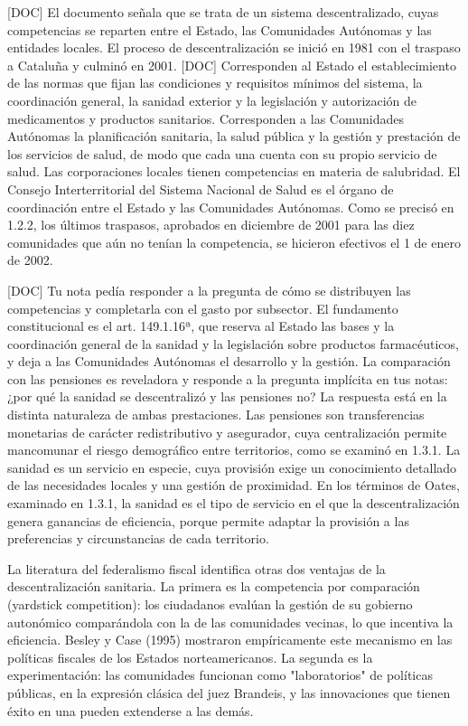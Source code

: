 \documentclass[10pt,a4paper]{article}
\begin{document}
[DOC] El documento señala que se trata de un sistema descentralizado, cuyas competencias se reparten entre el Estado, las Comunidades Autónomas y las entidades locales. El proceso de descentralización se inició en 1981 con el traspaso a Cataluña y culminó en 2001. [DOC] Corresponden al Estado el establecimiento de las normas que fijan las condiciones y requisitos mínimos del sistema, la coordinación general, la sanidad exterior y la legislación y autorización de medicamentos y productos sanitarios. Corresponden a las Comunidades Autónomas la planificación sanitaria, la salud pública y la gestión y prestación de los servicios de salud, de modo que cada una cuenta con su propio servicio de salud. Las corporaciones locales tienen competencias en materia de salubridad. El Consejo Interterritorial del Sistema Nacional de Salud es el órgano de coordinación entre el Estado y las Comunidades Autónomas. Como se precisó en 1.2.2, los últimos traspasos, aprobados en diciembre de 2001 para las diez comunidades que aún no tenían la competencia, se hicieron efectivos el 1 de enero de 2002.

[DOC] Tu nota pedía responder a la pregunta de cómo se distribuyen las competencias y completarla con el gasto por subsector. El fundamento constitucional es el art. 149.1.16ª, que reserva al Estado las bases y la coordinación general de la sanidad y la legislación sobre productos farmacéuticos, y deja a las Comunidades Autónomas el desarrollo y la gestión. La comparación con las pensiones es reveladora y responde a la pregunta implícita en tus notas: ¿por qué la sanidad se descentralizó y las pensiones no? La respuesta está en la distinta naturaleza de ambas prestaciones. Las pensiones son transferencias monetarias de carácter redistributivo y asegurador, cuya centralización permite mancomunar el riesgo demográfico entre territorios, como se examinó en 1.3.1. La sanidad es un servicio en especie, cuya provisión exige un conocimiento detallado de las necesidades locales y una gestión de proximidad. En los términos de Oates, examinado en 1.3.1, la sanidad es el tipo de servicio en el que la descentralización genera ganancias de eficiencia, porque permite adaptar la provisión a las preferencias y circunstancias de cada territorio.

La literatura del federalismo fiscal identifica otras dos ventajas de la descentralización sanitaria. La primera es la competencia por comparación (yardstick competition): los ciudadanos evalúan la gestión de su gobierno autonómico comparándola con la de las comunidades vecinas, lo que incentiva la eficiencia. Besley y Case (1995) mostraron empíricamente este mecanismo en las políticas fiscales de los Estados norteamericanos. La segunda es la experimentación: las comunidades funcionan como "laboratorios" de políticas públicas, en la expresión clásica del juez Brandeis, y las innovaciones que tienen éxito en una pueden extenderse a las demás.
\end{document}
